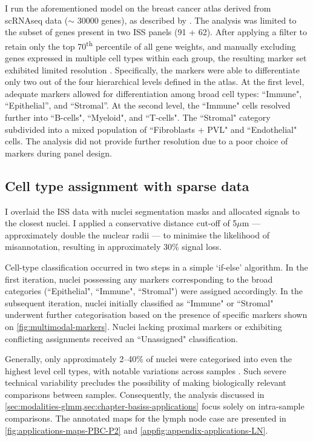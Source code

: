 I run the aforementioned model on the breast cancer atlas derived from \ac{scRNAseq} data ($\sim$ 30000 genes), as described by \textcite{Wu2021-uq}. The analysis was limited to the subset of genes present in two \ac{ISS} panels (91 + 62). After applying a filter to retain only the top 70\textsuperscript{th} percentile of all gene weights, and manually excluding genes expressed in multiple cell types within each group, the resulting marker set exhibited limited resolution . Specifically, the markers were able to differentiate only two out of the four hierarchical levels defined in the atlas. At the first level, adequate markers allowed for differentiation among broad cell types: ``Immune", ``Epithelial'', and ``Stromal''. At the second level, the ``Immune" cells resolved further into ``B-cells", ``Myeloid", and ``T-cells". The ``Stromal" category subdivided into a mixed population of ``Fibroblasts + PVL" and ``Endothelial" cells. The analysis did not provide further resolution due to a poor choice of markers during panel design.

\subsection{Cell type assignment with sparse data}
\label{sec:modalities-celltype}

I overlaid the \ac{ISS} data with nuclei segmentation masks and allocated signals to the closest nuclei. I applied a conservative distance cut-off of 5$\mu$m — approximately double the nuclear radii — to minimise the likelihood of misannotation, resulting in approximately 30\% signal loss.

Cell-type classification occurred in two steps in a simple `if-else' algorithm. In the first iteration, nuclei possessing any markers corresponding to the broad categories (``Epithelial", ``Immune", ``Stromal") were assigned accordingly. In the subsequent iteration, nuclei initially classified as ``Immune" or ``Stromal" underwent further categorisation based on the presence of specific markers shown on \cref{fig:multimodal-markers}. Nuclei lacking proximal markers or exhibiting conflicting assignments received an ``Unassigned" classification. 

Generally, only approximately 2--40\% of nuclei were categorised into even the highest level cell types, with notable variations across samples . Such severe technical variability precludes the possibility of making biologically relevant comparisons between samples. Consequently, the analysis discussed in \cref{sec:modalities-glmm,sec:chapter-basiss-applications} focus solely on intra-sample comparisons. The annotated maps for the lymph node case are presented in \cref{fig:applications-maps-PBC-P2} and \cref{appfig:appendix-applications-LN}.

